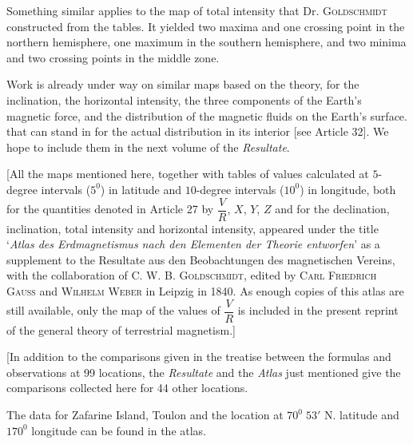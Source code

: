 \clearpage
{}
Something similar applies to the map of total intensity that Dr. \textsc{Goldschmidt} constructed from the tables. It yielded two maxima and one crossing point in the northern hemisphere, one maximum in the southern hemisphere, and two minima and two crossing points in the middle zone.

Work is already under way on similar maps based on the theory, for the inclination, the horizontal intensity, the three components of the Earth's magnetic force, and the distribution of the magnetic fluids on the Earth's surface. that can stand in for the actual distribution in its interior [see Article 32]. We hope to include them in the next volume of the \textit{Resultate}.

[All the maps mentioned here, together with tables of values calculated at $5$-degree intervals ($5^0$) in latitude and $10$-degree intervals ($10^0$) in longitude, both for the quantities denoted in Article 27 by $\dfrac VR$, $X$, $Y$, $Z$ and for the declination, inclination, total intensity and horizontal intensity, appeared under the title ‘\textit{Atlas des Erdmagnetismus nach den Elementen der Theorie entworfen}’ as a supplement to the Resultate aus den Beobachtungen des magnetischen Vereins, with the collaboration of \textsc{C. W. B. Goldschmidt}, edited by \textsc{Carl Friedrich Gauss} and \textsc{Wilhelm Weber} in Leipzig in 1840. As enough copies of this atlas are still available, only the map of the values of $\dfrac VR$ is included in the present reprint of the general theory of terrestrial magnetism.]

[In addition to the comparisons given in the treatise between the formulas and observations at 99 locations, the \textit{Resultate} and the \textit{Atlas} just mentioned give the comparisons collected here for 44 other locations.

The data for Zafarine Island, Toulon and the location at $70^0\;53'$ N. latitude and $170^0$ longitude can be found in the atlas.

